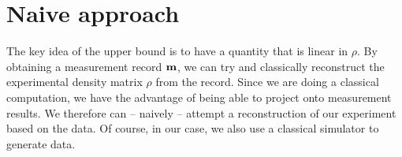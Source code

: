 %
%
%
%
%
%


\section{Naive approach}\label{sec:naive-approach}
The key idea of the upper bound is to have a quantity that is linear in $\rho$.
By obtaining a measurement record $\vb{m}$, we can try and classically
reconstruct the experimental density matrix $\rho$ from the record. Since we
are doing a classical computation, we have the advantage of being able to
project onto measurement results. We therefore can -- naively -- attempt a
reconstruction of our experiment based on the data. Of course, in our case, we
also use a classical simulator to generate data.

